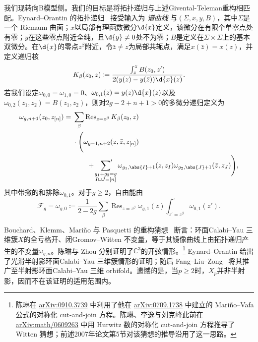 \documentclass{amsart}
\theoremstyle{definition}
\theoremstyle{remark}
\theoremstyle{plain}
\theoremstyle{definition}
\theoremstyle{remark}
\newcommand{\C}{\mathbb{C}}
\newcommand{\mc}[1]{\mathcal{#1}}
\newcommand{\on}[1]{\operatorname{#1}}
\newcommand{\1}{\mathbf{1}}
\newcommand{\2}{\mathbf{2}}
\newcommand{\3}{\mathbf{3}}
\begin{document}
我们现转向B模型侧。我们的目标是将拓扑递归与上述Givental-Teleman重构相匹配。Eynard--Orantin 的拓扑递归~\cite{EO2007} 接受输入为 \textit{谱曲线} 与\((\Sigma,x,y,B)\)，其中\(\Sigma\)是一个 Riemann 曲面；\(x\)以局部有理函数微分\(\d{x}\)定义，该微分在有限个单零点处有零；\(y\)在这些零点附近全纯，且\(\d{y} \neq 0\)处不为零；\(B\)是定义在\(\Sigma \times \Sigma\)上的基本双微分。在\(\d{x}\)的零点\(z^{\beta}\)附近，令\(\bar{z} \neq z\)为局部共轭点，满足\(x(\bar{z}) = x(z)\)，并定义递归核
\[ K_{\beta}(z_0,z) \coloneqq \frac{\int_{\bar{z}}^z B(z_0,z')}{2(y(z)-y(\bar{z}))\d{x}(z)}. \]
若我们设定\(\omega_{0,0} = \omega_{1,0} = 0\)、\(\omega_{0,1}(z) = y(z)\d{x}(z)\)以及\(\omega_{0,2}(z_1,z_2) = B(z_1,z_2)\)，则对\(2g-2+n+1 > 0\)的多微分递归定义为
\begin{align*}
    \omega_{g,n+1}(z_0,z_{[n]}) ={}& \sum_{\beta}\on{Res}_{z = z^{\beta}} K_{\beta}(z_0,z) \\
    &\cdot \Bigg( \omega_{g-1,n+2}(z,\bar{z},z_{[n]}) \\
    &\qquad + \sideset{}{'}\sum_{\substack{g_1+g_2 = g \\ I \sqcup J = [n]}}\omega_{g_1,\abs{I}+1}(z,z_I)\omega_{g_2,\abs{J}+1}(\bar{z},z_J)\Bigg),
\end{align*}
其中带撇的和排除\(\omega_{0,1}\)。对于\(g \geq 2\)，自由能由
\[ \mc{F}_g = \omega_{g,0} \coloneqq \frac{1}{2-2g}\sum_{\beta}\on{Res}_{z=z^{\beta}}\omega_{g,1}(z)\int_{z'=z^{\beta}}^z \omega_{0,1}(z'). \]

Bouchard、Klemm、Mari\~{n}o 与 Pasquetti 的重构猜想~\cite{BKMP2009} 断言：环面Calabi--Yau 三维簇\(X\)的全亏格开、闭Gromov--Witten 不变量，等于其镜像曲线上由拓扑递归产生的不变量\(\omega_{g,n}\)。陈琳与 Zhou 分别证明了\(\C^3\)的开弦情形。\footnote{陈琳在 \href{https://arxiv.org/abs/0910.3739}{arXiv:0910.3739} 中利用了他在 \href{https://arxiv.org/abs/0709.1738}{arXiv:0709.1738} 中建立的 Mari\~{n}o--Vafa 公式的对称化 cut-and-join 方程。陈琳、李逸与刘克峰此前在 \href{https://arxiv.org/abs/math/0609263}{arXiv:math/0609263} 中用 Hurwitz 数的对称化 cut-and-join 方程推导了 Witten 猜想；前述2007年论文第5节对该猜想的推导沿用了这一思路。} Eynard--Orantin 给出了光滑半射影环面Calabi--Yau 三维簇情形的证明；随后 Fang--Liu--Zong~\cite{FLZ2020} 将其推广至半射影环面Calabi--Yau 三维 orbifold。遗憾的是，当\(p \geq 2\)时，\(X_p\)并非半射影，因而不在该证明的适用范围内。
\end{document}
